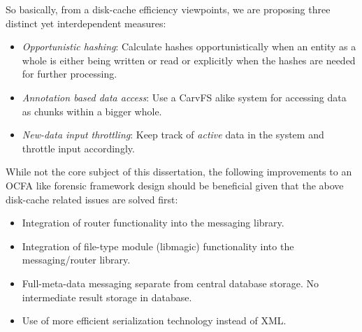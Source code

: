 So basically, from a disk-cache efficiency viewpoints, we are proposing three distinct yet interdependent measures:
\begin{itemize}
\item \emph{Opportunistic hashing}: Calculate hashes opportunistically when an entity as a whole is either being written or read or explicitly when the hashes are needed for further processing.
\item \emph{Annotation based data access}: Use a CarvFS alike system for accessing data as chunks within a bigger whole.
\item \emph{New-data input throttling}: Keep track of \emph{active} data in the system and throttle input accordingly.
\end{itemize}
While not the core subject of this dissertation, the following improvements to an OCFA like  forensic framework design should be beneficial given that the above disk-cache related issues are solved first:
\begin{itemize}
\item Integration of router functionality into the messaging library.
\item Integration of file-type module (libmagic) functionality into the messaging/router library.
\item Full-meta-data messaging separate from central database storage. No intermediate result storage in database.
\item Use of more efficient serialization technology instead of XML.
\end{itemize}

